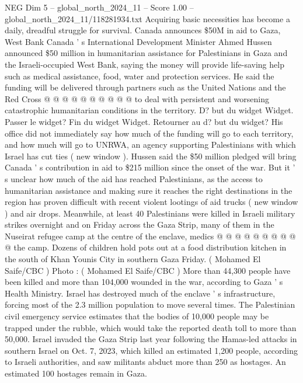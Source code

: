 \begin{textsample}{NEG Dim 5 – global\_north\_2024\_11 – Score 1.00 – global\_north\_2024\_11/118281934.txt}
Acquiring basic necessities has become a daily, dreadful struggle for survival.
Canada announces \$50M in aid to Gaza, West Bank Canada ' s International Development Minister Ahmed Hussen announced \$50 million in humanitarian assistance for Palestinians in Gaza and the Israeli-occupied West Bank, saying the money will provide life-saving help such as medical assistance, food, water and protection services.
He said the funding will be delivered through partners such as the United Nations and the Red Cross @ @ @ @ @ @ @ @ @ @ to deal with persistent and worsening catastrophic humanitarian conditions in the territory.
D? but du widget Widget.
Passer le widget?
Fin du widget Widget.
Retourner au d? but du widget?
His office did not immediately say how much of the funding will go to each territory, and how much will go to UNRWA, an agency supporting Palestinians with which Israel has cut ties ( new window ).
Hussen said the \$50 million pledged will bring Canada ' s contribution in aid to \$215 million since the onset of the war.
But it ' s unclear how much of the aid has reached Palestinians, as the access to humanitarian assistance and making sure it reaches the right destinations in the region has proven difficult with recent violent lootings of aid trucks ( new window ) and air drops.
Meanwhile, at least 40 Palestinians were killed in Israeli military strikes overnight and on Friday across the Gaza Strip, many of them in the Nuseirat refugee camp at the centre of the enclave, medics @ @ @ @ @ @ @ @ @ @ the camp.
Dozens of children hold pots out at a food distribution kitchen in the south of Khan Younis City in southern Gaza Friday. ( Mohamed El Saife/CBC ) Photo : ( Mohamed El Saife/CBC ) More than 44,300 people have been killed and more than 104,000 wounded in the war, according to Gaza ' s Health Ministry.
Israel has destroyed much of the enclave ' s infrastructure, forcing most of the 2.3 million population to move several times.
The Palestinian civil emergency service estimates that the bodies of 10,000 people may be trapped under the rubble, which would take the reported death toll to more than 50,000.
Israel invaded the Gaza Strip last year following the Hamas-led attacks in southern Israel on Oct. 7, 2023, which killed an estimated 1,200 people, according to Israeli authorities, and saw militants abduct more than 250 as hostages.
An estimated 100 hostages remain in Gaza.

\end{textsample}
